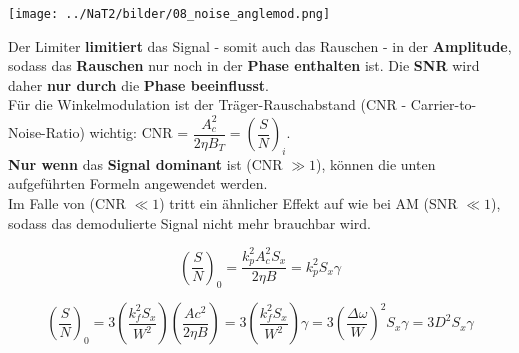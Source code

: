 \begin{center}
	\texttt{[image: ../NaT2/bilder/08\_noise\_anglemod.png]}
\end{center}
Der Limiter \textbf{limitiert} das Signal - somit auch das Rauschen - in der \textbf{Amplitude}, 
sodass das \textbf{Rauschen} nur noch in der \textbf{Phase enthalten} ist. 
Die \textbf{SNR} wird daher \textbf{nur durch }die \textbf{Phase beeinflusst}. \\ 

Für die Winkelmodulation ist der Träger-Rauschabstand (CNR - Carrier-to-Noise-Ratio) wichtig: 
CNR = $ \dfrac{A_c^2}{2 \eta B_T} = \left(\dfrac{S}{N}\right)_i$. \\
\textbf{Nur wenn} das \textbf{Signal dominant} ist (CNR $\gg 1$), können die unten aufgeführten
Formeln angewendet werden. \\ 
Im Falle von (CNR $\ll 1$) tritt ein ähnlicher Effekt auf wie bei AM (SNR $\ll 1$), 
sodass das demodulierte Signal nicht mehr brauchbar wird.

$$ \left(\dfrac{S}{N}\right)_0 =
\dfrac{k_p^2 A_c^2 S_x}{2 \eta B} = k_p^2 S_x \gamma $$

$$ \left(\dfrac{S}{N}\right)_0 =
3 \left(\dfrac{k_f^2 S_x}{W^2}\right) \left(\dfrac{Ac^2}{2 \eta B}\right)
= 3 \left(\frac{k_f^2 S_x}{W^2}\right) \gamma = 
3 \left(\dfrac{\Delta \omega}{W}\right)^2 S_x \gamma = 3 D^2 S_x \gamma$$

